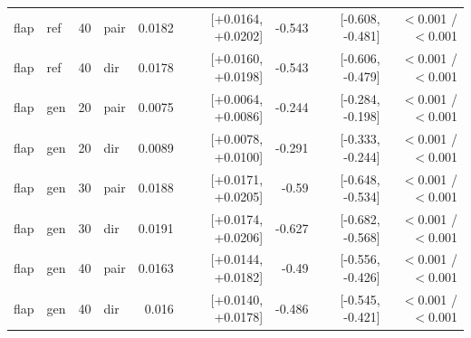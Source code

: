 \begin{tabular}{llllrrrrr}
flap & ref & 40 & pair & 0.0182 & [+0.0164, +0.0202] & -0.543 & [-0.608, -0.481] & $<$0.001 / $<$0.001 \\
flap & ref & 40 & dir & 0.0178 & [+0.0160, +0.0198] & -0.543 & [-0.606, -0.479] & $<$0.001 / $<$0.001 \\
flap & gen & 20 & pair & 0.0075 & [+0.0064, +0.0086] & -0.244 & [-0.284, -0.198] & $<$0.001 / $<$0.001 \\
flap & gen & 20 & dir & 0.0089 & [+0.0078, +0.0100] & -0.291 & [-0.333, -0.244] & $<$0.001 / $<$0.001 \\
flap & gen & 30 & pair & 0.0188 & [+0.0171, +0.0205] & -0.59 & [-0.648, -0.534] & $<$0.001 / $<$0.001 \\
flap & gen & 30 & dir & 0.0191 & [+0.0174, +0.0206] & -0.627 & [-0.682, -0.568] & $<$0.001 / $<$0.001 \\
flap & gen & 40 & pair & 0.0163 & [+0.0144, +0.0182] & -0.49 & [-0.556, -0.426] & $<$0.001 / $<$0.001 \\
flap & gen & 40 & dir & 0.016 & [+0.0140, +0.0178] & -0.486 & [-0.545, -0.421] & $<$0.001 / $<$0.001 \\
\bottomrule
\end{tabular}
